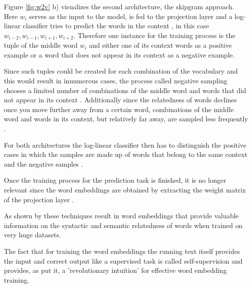 Figure \ref{fig:w2v} b) visualizes the second architecture, the skipgram approach. Here $w_i$ serves as the input to the model, is fed to the projection layer and a log-linear classifier tries to predict the words in the context \citep{mikolov2013efficient}, in this case $w_{i-2}, w_{i-1},w_{i+1},w_{i+2}$. Therefore one instance for the training process is the tuple of the middle word $w_i$ and either one of its context words as a positive example or a word that does not appear in its context as a negative example. 

Since such tuples could be created for each combination of the vocabulary and this would result in innumerous cases, the process called negative sampling chooses a limited number of combinations of the middle word and words that did not appear in its context \citep{karimi2021sampling}.
Additionally since the relatedness of words declines once you move further away from a certain word, combinations of the middle word and words in its context, but relatively far away, are sampled less frequently \citep{mikolov2013efficient}.

For both architectures the log-linear classifier then has to distinguish the positive cases in which the samples are made up of words that belong to the same context and the negative samples \citep{jurafsky2021}.

Once the training process for the prediction task is finished, it is no longer relevant since the word embeddings are obtained by extracting the weight matrix of the projection layer \citep{mikolov2013efficient}.

As shown by \citet{mikolov2013efficient} these techniques result in word embeddings that provide valuable information on the syntactic and semantic relatedness of words when trained on very huge datasets.

The fact that for training the word embeddings the running text itself provides the input and correct output like a supervised task is called self-supervision and provides, as \citet{jurafsky2021} put it, a 'revolutionary intuition' for effective word embedding training.




